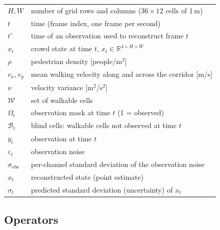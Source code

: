\documentclass[english, 12pt, a4paper, elec, utf8, a-2b, online]{aaltothesis}
\begin{document}
\begin{longtable}{p{}L{0.72\textwidth}}
$H, W$                    & number of grid rows and columns ($36 \times 12$ cells of 1\,m) \\
$t$                       & time (frame index, one frame per second) \\
$t'$                      & time of an observation used to reconstruct frame $t$ \\
$x_t$                     & crowd state at time $t$, $x_t \in \mathbb{R}^{4 \times H \times W}$ \\
$\rho$                    & pedestrian density [people/m$^2$] \\
$v_x, v_y$                & mean walking velocity along and across the corridor [m/s] \\
$\nu$                     & velocity variance [m$^2$/s$^2$] \\
$\mathcal{W}$             & set of walkable cells \\
$\Omega_t$                & observation mask at time $t$ (1 = observed) \\
$\mathcal{B}_t$           & blind cells: walkable cells not observed at time $t$ \\
$y_t$                     & observation at time $t$ \\
$\varepsilon_t$           & observation noise \\
$\sigma_{\mathrm{obs}}$   & per-channel standard deviation of the observation noise \\
$\hat{x}_t$               & reconstructed state (point estimate) \\
$\hat{\sigma}_t$          & predicted standard deviation (uncertainty) of $\hat{x}_t$ \\
\end{longtable}

\subsection*{Operators}
\end{document}
